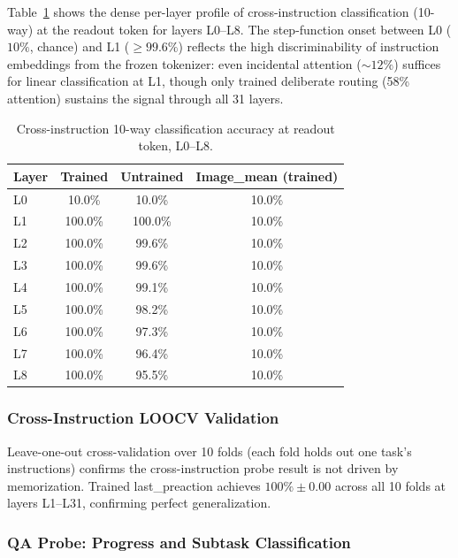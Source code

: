 Table~\ref{tab:dense_routing} shows the dense per-layer profile of cross-instruction classification (10-way) at the readout token for layers L0--L8.
The step-function onset between L0 ($10\%$, chance) and L1 (${\geq}99.6\%$) reflects the high discriminability of instruction embeddings from the frozen tokenizer: even incidental attention (${\sim}12\%$) suffices for linear classification at L1, though only trained deliberate routing (58\% attention) sustains the signal through all 31 layers.

\begin{table}[h]
\centering
\caption{Cross-instruction 10-way classification accuracy at readout token, L0--L8.}
\label{tab:dense_routing}
\small
\begin{tabular}{lccc}
\toprule
Layer & Trained & Untrained & Image\_mean (trained) \\
\midrule
L0 & 10.0\% & 10.0\% & 10.0\% \\
L1 & 100.0\% & 100.0\% & 10.0\% \\
L2 & 100.0\% & 99.6\% & 10.0\% \\
L3 & 100.0\% & 99.6\% & 10.0\% \\
L4 & 100.0\% & 99.1\% & 10.0\% \\
L5 & 100.0\% & 98.2\% & 10.0\% \\
L6 & 100.0\% & 97.3\% & 10.0\% \\
L7 & 100.0\% & 96.4\% & 10.0\% \\
L8 & 100.0\% & 95.5\% & 10.0\% \\
\bottomrule
\end{tabular}
\end{table}

\subsubsection{Cross-Instruction LOOCV Validation}
\label{sec:loocv}

Leave-one-out cross-validation over 10 folds (each fold holds out one task's instructions) confirms the cross-instruction probe result is not driven by memorization.
Trained last\_preaction achieves $100\% \pm 0.00$ across all 10 folds at layers L1--L31, confirming perfect generalization.

\subsubsection{QA Probe: Progress and Subtask Classification}
\label{sec:qa_probe}

